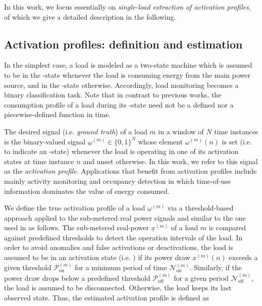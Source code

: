 \documentclass[twocolumn,letter,10pt]{IEEEtran} %
\begin{document}
In this work, we focus essentially on \emph{single-load extraction of activation profiles}, of which we give a detailed description in the following.

\subsection{Activation profiles: definition and estimation}

In the simplest case, a load is modeled as a two-state machine which is assumed to be in the \on-state whenever the load is consuming energy from the main power source, and in the \off-state otherwise. Accordingly, load monitoring becomes a binary classification task.
Note that in contrast to previous works, the consumption profile of a load during its \on-state need not be a defined \cite{Zeifman_2011_VAST} nor a piecewise-defined function in time.

The desired signal (i.e. \emph{ground truth}) of a load $m$ in a window of $N$ time instances is the binary-valued signal $\underline{\omega}^{(m)}\in \{0, 1\}^N$ whose element $\omega^{(m)}(n)$ is set (i.e. to indicate an \on-state) whenever the load is operating in one of its activation states at time instance $n$ and unset otherwise. In this work, we refer to this signal as the \emph{activation profile}.
Applications that benefit from activation profiles include mainly activity monitoring and occupancy detection %
in which time-of-use information dominates the value of energy consumed.

We define the true activation profile of a load $\underline{\omega}^{(m)}$ via a threshold-based approach applied to the sub-metered real power signals and similar to the one used in \cite{Kelly_2015} as follows.
The sub-metered real-power $\underline{x}^{(m)}$ of a load $m$ is compared against predefined thresholds to detect the operation intervals of the load. In order to avoid anomalies and false activations or deactivations, the load is assumed to be in an activation state (i.e. \on) if its power draw $x^{(m)}(n)$ exceeds a given threshold $\mathcal{P}_{\text{on}}^{(m)}$ for a minimum period of time $\mathcal{N}_{\text{on}}^{(m)}$. Similarly, if the power draw drops below a predefined threshold $\mathcal{P}_{\text{off}}^{(m)}$ for a given period $\mathcal{N}_{\text{off}}^{(m)}$, the load is assumed to be disconnected. Otherwise, the load keeps its last observed state. Thus, the estimated activation profile is defined as
\end{document}
